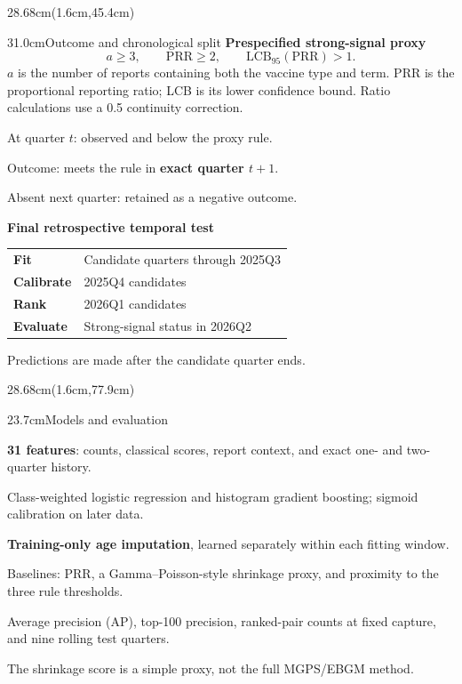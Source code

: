 \documentclass[12pt]{article}
\newcommand{\smallbody}{\fontsize{27}{35}\selectfont}
\newcommand{\labeltext}[1]{{\color{Blue}\bfseries #1}}
\newcommand{\spacepara}{\par\vspace{0.42cm}}
\newcommand{\bulletline}[1]{\par\noindent\hangindent=0.72cm\hangafter=1{\color{Teal}\textbullet}\hspace{0.35cm}#1\par\vspace{0.22cm}}
\begin{document}
\begin{textblock*}{28.68cm}(1.6cm,45.4cm)
\begin{posterbox}{31.0cm}{Outcome and chronological split}
\labeltext{Prespecified strong-signal proxy}
\vspace{0.1cm}
\[
a\geq 3,\qquad \mathrm{PRR}\geq 2,\qquad
\mathrm{LCB}_{95}(\mathrm{PRR})>1.
\]
{\smallbody $a$ is the number of reports containing both the vaccine type and term.
PRR is the proportional reporting ratio; LCB is its lower confidence bound.
Ratio calculations use a 0.5 continuity correction.}
\spacepara
\bulletline{At quarter $t$: observed and below the proxy rule.}
\bulletline{Outcome: meets the rule in \textbf{exact quarter $t+1$}.}
\bulletline{Absent next quarter: retained as a negative outcome.}
\vspace{0.4cm}
\labeltext{Final retrospective temporal test}\par\vspace{0.3cm}
{\renewcommand{\arraystretch}{1.38}
\begin{tabularx}{\linewidth}{@{}>{\bfseries}l>{\raggedright\arraybackslash}X@{}}
\toprule
Fit & Candidate quarters through 2025Q3\\
Calibrate & 2025Q4 candidates\\
Rank & 2026Q1 candidates\\
Evaluate & Strong-signal status in 2026Q2\\
\bottomrule
\end{tabularx}}
\par\vspace{0.4cm}
{\smallbody\color{Muted}Predictions are made after the candidate quarter ends.}
\end{posterbox}
\end{textblock*}

\begin{textblock*}{28.68cm}(1.6cm,77.9cm)
\begin{posterbox}{23.7cm}{Models and evaluation}
\bulletline{\textbf{31 features}: counts, classical scores, report context, and exact one- and two-quarter history.}
\bulletline{Class-weighted logistic regression and histogram gradient boosting; sigmoid calibration on later data.}
\bulletline{\textbf{Training-only age imputation}, learned separately within each fitting window.}
\bulletline{Baselines: PRR, a Gamma--Poisson-style shrinkage proxy, and proximity to the three rule thresholds.}
\bulletline{Average precision (AP), top-100 precision, ranked-pair counts at fixed capture, and nine rolling test quarters.}
\vspace{0.22cm}
{\smallbody\color{Muted}The shrinkage score is a simple proxy, not the full MGPS/EBGM method.}
\end{posterbox}
\end{textblock*}
\end{document}
